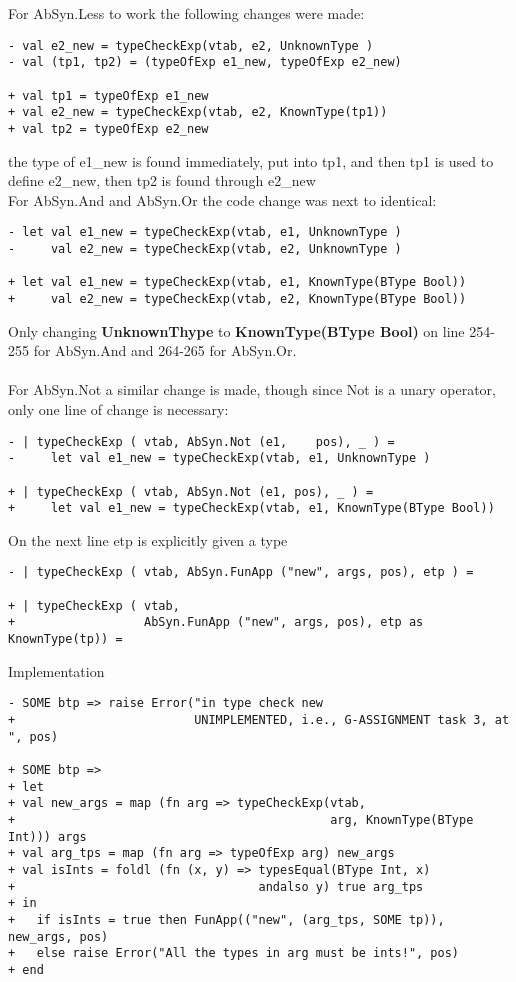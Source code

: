 For AbSyn.Less to work the following changes were made:
\begin{verbatim}
- val e2_new = typeCheckExp(vtab, e2, UnknownType )
- val (tp1, tp2) = (typeOfExp e1_new, typeOfExp e2_new)

+ val tp1 = typeOfExp e1_new
+ val e2_new = typeCheckExp(vtab, e2, KnownType(tp1))
+ val tp2 = typeOfExp e2_new 
\end{verbatim}
the type of e1\_new is found immediately, put into tp1, and then tp1 is used to
define e2\_new, then tp2 is found through e2\_new
\\
For AbSyn.And and AbSyn.Or the code change was next to identical:
\begin{verbatim}
- let val e1_new = typeCheckExp(vtab, e1, UnknownType )
-     val e2_new = typeCheckExp(vtab, e2, UnknownType )

+ let val e1_new = typeCheckExp(vtab, e1, KnownType(BType Bool))
+     val e2_new = typeCheckExp(vtab, e2, KnownType(BType Bool))
\end{verbatim}
Only changing \textbf{UnknownThype} to \textbf{KnownType(BType Bool)} on line
254-255 for AbSyn.And and 264-265 for AbSyn.Or.\\
\\
For AbSyn.Not a similar change is made, though since Not is a unary operator,
only one line of change is necessary:
\begin{verbatim}
- | typeCheckExp ( vtab, AbSyn.Not (e1,    pos), _ ) =
-     let val e1_new = typeCheckExp(vtab, e1, UnknownType )

+ | typeCheckExp ( vtab, AbSyn.Not (e1, pos), _ ) =
+     let val e1_new = typeCheckExp(vtab, e1, KnownType(BType Bool))
\end{verbatim}
On the next line etp is explicitly given a type
\begin{verbatim}
- | typeCheckExp ( vtab, AbSyn.FunApp ("new", args, pos), etp ) =

+ | typeCheckExp ( vtab, 
+                  AbSyn.FunApp ("new", args, pos), etp as KnownType(tp)) =
\end{verbatim}
Implementation 
\begin{verbatim}
- SOME btp => raise Error("in type check new 
+                         UNIMPLEMENTED, i.e., G-ASSIGNMENT task 3, at ", pos)

+ SOME btp => 
+ let
+ val new_args = map (fn arg => typeCheckExp(vtab,
+                                            arg, KnownType(BType Int))) args
+ val arg_tps = map (fn arg => typeOfExp arg) new_args
+ val isInts = foldl (fn (x, y) => typesEqual(BType Int, x) 
+                                  andalso y) true arg_tps 
+ in
+   if isInts = true then FunApp(("new", (arg_tps, SOME tp)), new_args, pos)
+   else raise Error("All the types in arg must be ints!", pos)
+ end
\end{verbatim}
